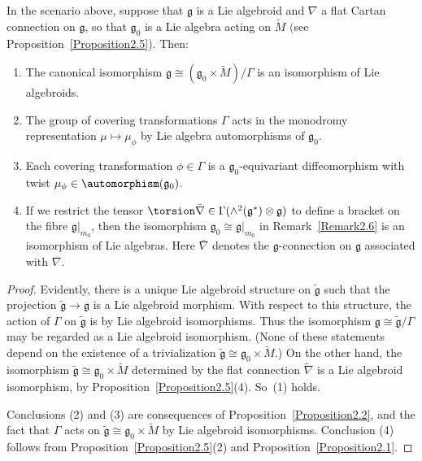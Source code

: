 \begin{PropositionBlaom}\label{Proposition2.6}
  In the scenario above, suppose that $\mathfrak g$ is a Lie algebroid
  and $\nabla$ a flat Cartan connection on $\mathfrak g$, so that
  ${\mathfrak g}_0$ is a Lie algebra acting on $\tilde M$ $($see
  Proposition~{\rm \ref{Proposition2.5})}. Then:
\begin{enumerate}\itemsep=0pt
\item[$(1)$]%
The canonical isomorphism ${\mathfrak g} \cong ({\mathfrak g}_0
  \times \tilde M)/\Gamma$ is an isomorphism of Lie algebroids.
\item[$(2)$]%
The group of covering transformations $\Gamma$ acts in the
  monodromy representation $\mu \mapsto \mu_\phi$ by Lie algebra
  automorphisms of ${\mathfrak g}_0$.
\item[$(3)$]%
Each covering transformation $\phi \in \Gamma $ is a
  ${\mathfrak g}_0 $-equivariant diffeomorphism with twist
  $\mu_\phi\in \automorphism({\mathfrak g}_0)$.
\item[$(4)$]%
If we restrict the tensor $\torsion \bar\nabla \in
  \Gamma(\wedge^2({\mathfrak g}^*)\otimes {\mathfrak g})$ to define a
  bracket on the fibre ${\mathfrak g}|_{m_0}$, then the isomorphism
  ${\mathfrak g}_0\cong {\mathfrak g}|_{m_0}$ in Remark~{\rm \ref{Remark2.6}} is
  an isomorphism of Lie algebras. Here $\bar\nabla $ denotes the
  $\mathfrak g$-connection on $\mathfrak g$ associated with $\nabla$.
\end{enumerate}
\end{PropositionBlaom}

\begin{proof}
  Evidently, there is a unique Lie algebroid structure on $\tilde
  {\mathfrak g}$ such that the projection $\tilde {\mathfrak g}
  \rightarrow {\mathfrak g} $ is a Lie algebroid morphism. With
  respect to this structure, the action of $\Gamma$ on $\tilde
  {\mathfrak g} $ is by Lie algebroid isomorphisms. Thus the
  isomorphism ${\mathfrak g} \cong \tilde {\mathfrak g} / \Gamma $ may
  be regarded as a Lie algebroid isomorphism. (None of these
  statements depend on the existence of a trivialization $\tilde
  {\mathfrak g} \cong {\mathfrak g}_0 \times \tilde M$.) On the other
  hand, the isomorphism $\tilde {\mathfrak g} \cong {\mathfrak g}_0
  \times \tilde M$ determined by the f\/lat connection $\tilde \nabla $
  is a Lie algebroid isomorphism, by Proposition~\ref{Proposition2.5}(4).
   So~(1) holds.

  Conclusions (2) and (3) are consequences of
  Proposition~\ref{Proposition2.2}, %
  and the fact that $\Gamma $ acts on
  $\tilde {\mathfrak g} \cong {\mathfrak g}_0 \times \tilde M$ by Lie
  algebroid isomorphisms. Conclusion (4) follows from
  Proposition~\ref{Proposition2.5}(2) %
  and Proposition~\ref{Proposition2.1}. %
\end{proof}


